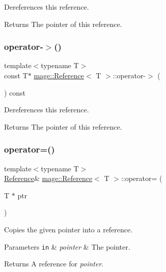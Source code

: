 Dereferences this reference.

\begin{DoxyReturn}{Returns}
The pointer of this reference. 
\end{DoxyReturn}
\hypertarget{classmage_1_1_reference_ab0f3ae3e1c9f71c211db4b1ec6dcca83}{}\label{classmage_1_1_reference_ab0f3ae3e1c9f71c211db4b1ec6dcca83} 
\subsubsection{\texorpdfstring{operator-\/$>$()}{operator->()}\hspace{0.1cm}{\footnotesize\ttfamily [2/2]}}
{\footnotesize\ttfamily template$<$typename T$>$ \\
const T$\ast$ \hyperlink{classmage_1_1_reference}{mage\+::\+Reference}$<$ T $>$\+::operator-\/$>$ (\begin{DoxyParamCaption}{ }\end{DoxyParamCaption}) const}

Dereferences this reference.

\begin{DoxyReturn}{Returns}
The pointer of this reference. 
\end{DoxyReturn}
\hypertarget{classmage_1_1_reference_abf1457f709eefcc56e23ad6f127cd9a4}{}\label{classmage_1_1_reference_abf1457f709eefcc56e23ad6f127cd9a4} 
\subsubsection{\texorpdfstring{operator=()}{operator=()}\hspace{0.1cm}{\footnotesize\ttfamily [1/2]}}
{\footnotesize\ttfamily template$<$typename T$>$ \\
\hyperlink{classmage_1_1_reference}{Reference}\& \hyperlink{classmage_1_1_reference}{mage\+::\+Reference}$<$ T $>$\+::operator= (\begin{DoxyParamCaption}\item[{T $\ast$}]{ptr }\end{DoxyParamCaption})}

Copies the given pointer into a reference.


\begin{DoxyParams}[1]{Parameters}
\mbox{\tt in}  & {\em pointer} & The pointer. \\
\hline
\end{DoxyParams}
\begin{DoxyReturn}{Returns}
A reference for {\itshape pointer}. 
\end{DoxyReturn}
\hypertarget{classmage_1_1_reference_a0e0fadab4a752fb78124380feeafb2a2}{}\label{classmage_1_1_reference_a0e0fadab4a752fb78124380feeafb2a2} 
